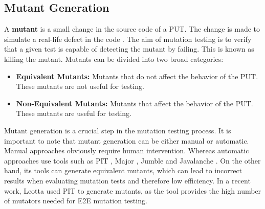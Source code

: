 \label{sec:background}

\subsection{Mutant Generation}
A \textbf{mutant} is a small change in the source code of a PUT. The change is made to simulate a
real-life defect in the code \cite{offutt2001mutation, jia2010analysis}. The aim of mutation testing is to verify that a given test is capable of detecting the mutant by failing. This is known as killing the mutant. Mutants can be divided into two broad categories:

\begin{itemize}
    \item \textbf{Equivalent Mutants:} Mutants that do not affect the behavior of
          the PUT. These mutants are not useful for testing.
    \item \textbf{Non-Equivalent Mutants:} Mutants that affect the behavior of the PUT. These mutants are useful for testing.
\end{itemize}

Mutant generation is a crucial step in the mutation testing process. It is important to note that mutant generation can be either manual or automatic. Manual approaches obviously require human intervention. Whereas automatic approaches use tools such as PIT \cite{leotta2024mutta, coles2016pit}, Major \cite{just2014major},
Jumble \cite{irvine2007jumble} and Javalanche \cite{schuler2009javalanche}.
On the other hand, its tools can generate equivalent mutants, which can lead to incorrect results when evaluating mutation tests and therefore low efficiency. In a recent work, Leotta \etal \cite{leotta2024mutta} used PIT to generate mutants, as the tool provides the high number of mutators needed for E2E mutation testing.

















